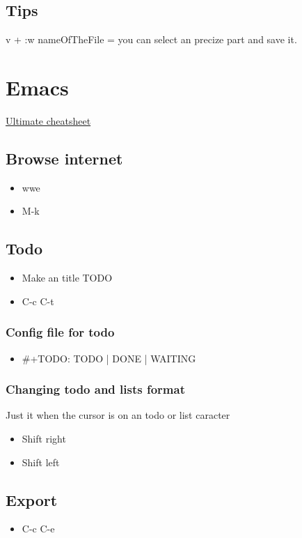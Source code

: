 \documentclass[11pt]{article}
\begin{document}
\subsection*{Tips}
\label{sec:org3bf189f}
v + :w nameOfTheFile = you can select an precize part and save it.
\section*{Emacs}
\label{sec:org95b10ad}
\href{https://github.com/niyumard/Doom-Emacs-Cheat-Sheet}{Ultimate cheatsheet}
\subsection*{Browse internet}
\label{sec:orga77133f}
\begin{itemize}
\item wwe
\item M-k
\end{itemize}
\subsection*{Todo}
\label{sec:org5bd9796}
\begin{itemize}
\item Make an title TODO
\item C-c C-t
\end{itemize}
\subsubsection*{Config file for todo}
\label{sec:org8189c4f}
\begin{itemize}
\item \#+TODO: TODO | DONE | WAITING
\end{itemize}
\subsubsection*{Changing todo and lists format}
\label{sec:org553f891}
Just it when the cursor is on an todo or list caracter
\begin{itemize}
\item Shift right
\item Shift left
\end{itemize}
\subsection*{Export}
\label{sec:org6908ea9}
\begin{itemize}
\item C-c C-e
\end{itemize}
\end{document}
